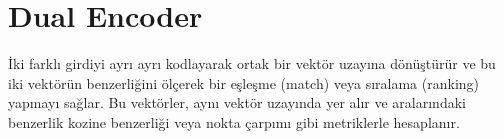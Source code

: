 \section{Dual Encoder}

İki farklı girdiyi ayrı ayrı kodlayarak ortak bir vektör uzayına dönüştürür ve bu iki vektörün benzerliğini ölçerek bir eşleşme (match) veya sıralama (ranking) yapmayı sağlar. Bu vektörler, aynı vektör uzayında yer alır ve aralarındaki benzerlik kozine benzerliği veya nokta çarpımı gibi metriklerle hesaplanır.



\newpage